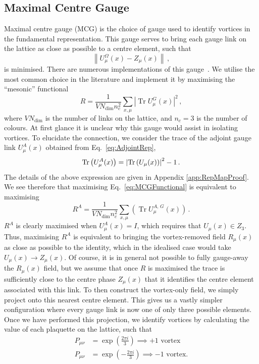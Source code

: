 \subsection{Maximal Centre Gauge}\label{sec:MCG}
Maximal centre gauge (MCG) is the choice of gauge used to identify vortices in the fundamental representation. This gauge serves to bring each gauge link on the lattice as close as possible to a centre element, such that
%
\begin{equation}
\left\| U _ { \mu } ^ { \Omega } ( x ) - Z _ { \mu } ( x ) \right\|\, ,
\end{equation}
%
is minimised. There are numerous implementations of this gauge~\cite{Montero:1999by,Faber:1999sq}. We utilise the most common choice in the literature and implement it by maximising the ``mesonic'' functional~\cite{Langfeld:2003ev}
%
\begin{equation}
R = \frac { 1 } { V N _ { \operatorname { dim } } n _ { c } ^ { 2 } } \sum _ { x , \mu } \left| \operatorname { Tr } U _ { \mu } ^ { G } ( x ) \right| ^ { 2 }\, ,
\label{eq:MCGFunctional}
\end{equation} 
%
where $VN _ { \operatorname { dim } }$ is the number of links on the lattice, and $n_c=3$ is the number of colours. At first glance it is unclear why this gauge would assist in isolating vortices. To elucidate the connection, we consider the trace of the adjoint gauge link $U^A_\mu(x)$ obtained from Eq.~\eqref{eq:AdjointRep},
%
\begin{equation}
\operatorname{Tr}\left(U^A_\mu(x)\right) = \left|\operatorname{Tr}\left(U_\mu(x)\right)\right|^2 - 1\, .
\end{equation}
%
The details of the above expression are given in Appendix \ref{app:RepMapProof}. We see therefore that maximising Eq.~\eqref{eq:MCGFunctional} is equivalent to maximising
%
\begin{equation}
R^A = \frac { 1 } { V N _ { \operatorname { dim } } n _ { c } ^ { 2 } } \sum _ { x , \mu } \left( \operatorname { Tr } U _ { \mu } ^ { A,\,G } ( x ) \right)\, .
\end{equation}
%
$R^A$ is clearly maximised when $U_\mu^A(x)=I$, which requires that $U_\mu(x) \in Z_3$. Thus, maximising $R^A$ is equivalent to bringing the vortex-removed field $R_\mu(x)$ as close as possible to the identity, which in the idealised case would take $U_\mu(x)\rightarrow Z_\mu(x)$. Of course, it is in general not possible to fully gauge-away the $R_\mu(x)$ field, but we assume that once $R$ is maximised the trace is sufficiently close to the centre phase $Z_\mu(x)$ that it identifies the centre element associated with this link. To then construct the vortex-only field, we simply project onto this nearest centre element. This gives us a vastly simpler configuration where every gauge link is now one of only three possible elements. Once we have performed this projection, we identify vortices by calculating the value of each plaquette on the lattice, such that
\begin{align*}
P_{\mu\nu} &= \exp\left(\frac{2\pi i}{3}\right)\implies +1 \text{ vortex}\\
P_{\mu\nu} &= \exp\left(-\frac{2\pi i}{3}\right)\implies -1 \text{ vortex.}
\end{align*}\\

